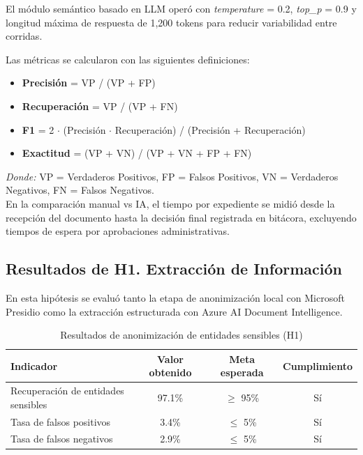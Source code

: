\documentclass[12pt]{article}
\begin{document}
El módulo semántico basado en LLM operó con \textit{temperature} = 0.2, \textit{top\_p} = 0.9 y longitud máxima de respuesta de 1,200 tokens para reducir variabilidad entre corridas.

Las métricas se calcularon con las siguientes definiciones:

\begin{itemize}
    \item \textbf{Precisión} = VP / (VP + FP)
    \item \textbf{Recuperación} = VP / (VP + FN)
    \item \textbf{F1} = 2 $\cdot$ (Precisión $\cdot$ Recuperación) / (Precisión + Recuperación)
    \item \textbf{Exactitud} = (VP + VN) / (VP + VN + FP + FN)
\end{itemize}

\noindent\textit{Donde:} VP = Verdaderos Positivos, FP = Falsos Positivos, VN = Verdaderos Negativos, FN = Falsos Negativos. \\

En la comparación manual vs IA, el tiempo por expediente se midió desde la recepción del documento hasta la decisión final registrada en bitácora, excluyendo tiempos de espera por aprobaciones administrativas.

\subsection{Resultados de H1. Extracción de Información}

En esta hipótesis se evaluó tanto la etapa de anonimización local con Microsoft Presidio como la extracción estructurada con Azure AI Document Intelligence.

\begin{table}[htbp]
\centering
\caption{Resultados de anonimización de entidades sensibles (H1)}
\vspace{0.3cm}
\label{tab:resultados-h1-anonimizacion}
\begin{tabularx}{\textwidth}{|>{\raggedright\arraybackslash}X|c|c|c|}
\hline
\textbf{Indicador} & \textbf{Valor obtenido} & \textbf{Meta esperada} & \textbf{Cumplimiento} \\
\hline
Recuperación de entidades sensibles & 97.1\% & $\geq$ 95\% & Sí \\
\hline
Tasa de falsos positivos & 3.4\% & $\leq$ 5\% & Sí \\
\hline
Tasa de falsos negativos & 2.9\% & $\leq$ 5\% & Sí \\
\hline
\end{tabularx}
\end{table}
\end{document}
